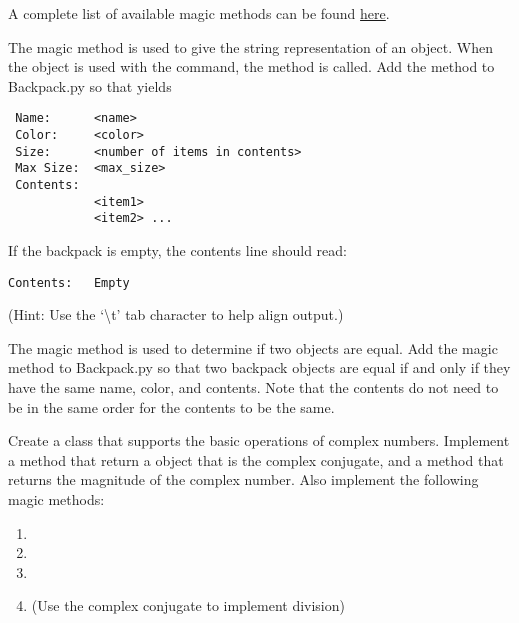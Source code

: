 A complete list of available magic methods can be found \href{https://docs.python.org/2/reference/datamodel.html#special-method-names}{here}.

\begin{problem}
The  magic method is used to give the string representation of an object.
When the object is used with the  command, the  method is called.
Add the  method to Backpack.py so that  yields
\begin{lstlisting}
 Name:		<name>
 Color:		<color>
 Size:		<number of items in contents>
 Max Size:	<max_size>
 Contents:
 			<item1>
 			<item2> ...
\end{lstlisting}

If the backpack is empty, the contents line should read:
\begin{lstlisting}
Contents:	Empty
\end{lstlisting}
(Hint: Use the `\textbackslash{t}' tab character to help align output.)

The  magic method is used to determine if two objects are equal.
Add the  magic method to Backpack.py so that two backpack objects are equal if and only if they have the same name, color, and contents.
Note that the contents do not need to be in the same order for the contents to be the same.
\end{problem}

\begin{problem}
Create a  class that supports the basic operations of complex numbers. Implement a  method that return a  object that is the complex conjugate, and a  method that returns the magnitude of the complex number.
Also implement the following magic methods:
\begin{enumerate}
\item {}
\item {}
\item {}
\item {} (Use the complex conjugate to implement division)
\end{enumerate}
\end{problem}
